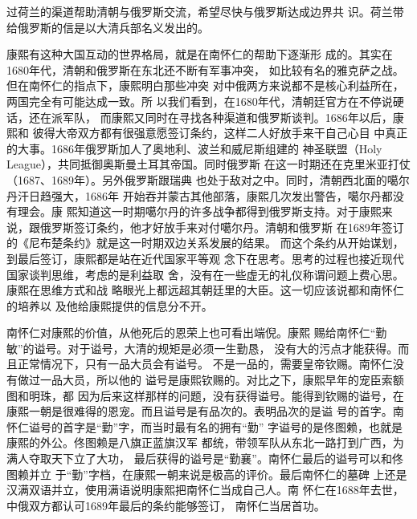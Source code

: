 过荷兰的渠道帮助清朝与俄罗斯交流，希望尽快与俄罗斯达成边界共%
识。荷兰带给俄罗斯的信是以大清兵部名义发出的。%
\par
康熙有这种大国互动的世界格局，就是在南怀仁的帮助下逐渐形%
成的。其实在1680年代，清朝和俄罗斯在东北还不断有军事冲突，%
如比较有名的雅克萨之战。但在南怀仁的指点下，康熙明白那些冲突%
对中俄两方来说都不是核心利益所在，两国完全有可能达成一致。所%
以我们看到，在1680年代，清朝廷官方在不停说硬话，还在派军队，%
而康熙又同时在寻找各种渠道和俄罗斯谈判。1686年以后，康熙和%
彼得大帝双方都有很强意愿签订条约，这样二人好放手来干自己心目%
中真正的大事。1686年俄罗斯加人了奥地利、波兰和威尼斯组建的%
神圣联盟（Holy League），共同抵御奥斯曼土耳其帝国。同时俄罗斯%
在这一时期还在克里米亚打仗（1687、1689年）。另外俄罗斯跟瑞典%
也处于敌对之中。同时，清朝西北面的噶尔丹汗日趋强大，1686年%
开始吞并蒙古其他部落，康熙几次发出警告，噶尔丹都没有理会。康%
熙知道这一时期噶尔丹的许多战争都得到俄罗斯支持。对于康熙来%
说，跟俄罗斯签订条约，他才好放手来对付噶尔丹。清朝和俄罗斯%
在1689年签订的《尼布楚条约》就是这一时期双边关系发展的结果。%
而这个条约从开始谋划，到最后签订，康熙都是站在近代国家平等观%
念下在思考。思考的过程也接近现代国家谈判思维，考虑的是利益取%
舍，没有在一些虚无的礼仪称谓问题上费心思。康熙在思维方式和战%
略眼光上都远超其朝廷里的大臣。这一切应该说都和南怀仁的培养以%
及他给康熙提供的信息分不开。%
\par
南怀仁对康熙的价值，从他死后的恩荣上也可看出端倪。康熙%
赐给南怀仁“勤敏”的谥号。对于谥号，大清的规矩是必须一生勤恳，%
没有大的污点才能获得。而且正常情况下，只有一品大员会有谥号。%
不是一品的，需要皇帝钦赐。南怀仁没有做过一品大员，所以他的%
谥号是康熙钦赐的。对比之下，康熙早年的宠臣索额图和明珠，都%
因为后来这样那样的问题，没有获得谥号。能得到钦赐的谥号，在%
康熙一朝是很难得的恩宠。而且谥号是有品次的。表明品次的是谥%
号的首字。南怀仁谥号的首字是“勤”字，而当时最有名的拥有“勤”%
字谥号的是佟图赖，也就是康熙的外公。佟图赖是八旗正蓝旗汉军%
都统，带领军队从东北一路打到广西，为满人夺取天下立了大功，%
最后获得的谥号是“勤襄”。南怀仁最后的谥号可以和佟图赖并立%
于“勤”字档，在康熙一朝来说是极高的评价。最后南怀仁的墓碑%
上还是汉满双语并立，使用满语说明康熙把南怀仁当成自己人。南%
怀仁在1688年去世，中俄双方都认可1689年最后的条约能够签订，%
南怀仁当居首功。%
